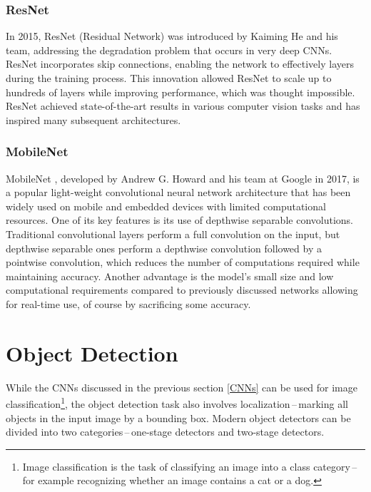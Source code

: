 \subsubsection{ResNet}

In 2015, ResNet (Residual Network) \cite{He2015} was introduced by Kaiming He
and his team, addressing the degradation problem that occurs in very deep CNNs.
ResNet incorporates skip connections, enabling the network to effectively
 layers during the training process. This innovation allowed ResNet to
scale up to hundreds of layers while improving performance, which was thought
impossible.  ResNet achieved state-of-the-art results in various computer vision
tasks and has inspired many subsequent architectures.


\subsubsection{MobileNet}

MobileNet \cite{Howard2017}, developed by Andrew G. Howard and his team at
Google in 2017, is a popular light-weight convolutional neural network
architecture that has been widely used on mobile and embedded devices with
limited computational resources. One of its key features is its use of depthwise
separable convolutions. Traditional convolutional layers perform a full
convolution on the input, but depthwise separable ones perform a depthwise
convolution followed by a pointwise convolution, which reduces the number of
computations required while maintaining accuracy. Another advantage is the
model's small size and low computational requirements compared to previously
discussed networks allowing for real-time use, of course by sacrificing some
accuracy.


\section{Object Detection}

While the CNNs discussed in the previous section \autoref{CNNs} can be used for
image classification\footnote{Image classification is the task of classifying an
image into a class category\,--\,for example recognizing whether an image
contains a cat or a dog.}, the object detection task also involves
localization\,--\,marking all objects in the input image by a bounding box.
Modern object detectors can be divided into two categories\,--\,one-stage
detectors and two-stage detectors. 


